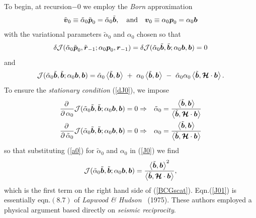 To begin, at recursion$-0$ we employ the {\em Born \/} approximation 
\begin{equation}
\tilde{\bmi  v}_{0}\equiv \tilde{\alpha}_{0}\tilde{\bmi  p}_{0}= 
\tilde{\alpha}_{0}\tilde{\bmi  b},
\quad \mbox{and} \quad
{\bmi  v}_{0}\equiv {\alpha}_{0}{\bmi  p}_{0}= {\alpha}_{0}{\bmi  b}
\end{equation}
with the variational parameters $\tilde{\alpha}_{0}$ and ${\alpha}_{0}$ 
chosen so that 
\begin{equation} \label{dJ0}
 \delta{\cal J}({\tilde{\alpha}}_{0}{\tilde{\bmi  p}}_{0},{\tilde{\bmi  
r}}_{-1};
{\alpha}_{0}{{\bmi  p}}_{0},{{\bmi  r}}_{-1})=\delta{\cal 
J}({\tilde{\alpha}}_{0}{\tilde{\bmi  b}},{\tilde{\bmi  b}};
{\alpha}_{0}{{\bmi  b}},{{\bmi  b}})=0
\end{equation}
and
\begin{equation} \label{J0}
{\cal 
J}({\tilde{\alpha}}_{0}{\tilde{\bmi  b}},{\tilde{\bmi  b}};
{\alpha}_0{{\bmi  b}},{{\bmi  
b}})=\tilde{\alpha}_{0}\left\langle\tilde{\bmi  
b},{\bmi  b}\right\rangle
\ +\  {\alpha}_{0} \left\langle\tilde{\bmi  b},{\bmi  b}\right\rangle
\ - \ \tilde{\alpha}_{0} {\alpha}_{0} \left\langle\tilde{\bmi  b},{\CB H} 
\cdot
{\bmi  b}\right\rangle.
\end{equation} 
To ensure the {\em stationary condition\/} (\ref{dJ0}), we impose
\begin{eqnarray} \label{a0}
{\frac{ \partial   \,}{ \partial   \,{ \alpha 
}_{0}}}{\cal 
J}({\tilde{\alpha}}_{0}{\tilde{\bmi  b}},{\tilde{\bmi  b}};
{\alpha}_0{{\bmi  b}},{{\bmi  b}})=0 &  
\Rightarrow  & {\tilde{ \alpha 
}}_{0}={\frac{\left\langle{\tilde{\bmi  b},{\bmi  
b}}\right\rangle}{\left\langle{\tilde{\bmi  b},{\CB H}
\cdot   {\bmi  b}}\right\rangle}}\nonumber\\
{\frac{ \partial   \,}{ \partial   \,\tilde{ \alpha 
}_{0}}}{\cal 
J}({\tilde{\alpha}}_{0}{\tilde{\bmi  b}},{\tilde{\bmi  b}};
{\alpha}_0{{\bmi  b}},{{\bmi  b}})=0 &  
\Rightarrow   & {{ \alpha 
}}_{0}={\frac{\left\langle{\tilde{\bmi  b},{\bmi  
b}}\right\rangle}{\left\langle{\tilde{\bmi  b},{\CB H}
\cdot   {\bmi  b}}\right\rangle}}
\end{eqnarray} 
so that substituting (\ref{a0}) for ${\tilde{\alpha}}_{0}$ and 
${\alpha}_{0}$
in (\ref{J0}) we find
\begin{equation} \label{J01}
{\cal 
J}({\tilde{\alpha}}_{0}{\tilde{\bmi  b}},{\tilde{\bmi  b}};
{\alpha}_0{{\bmi  b}},{{\bmi  b}})={\frac{\left\langle{\tilde{\bmi  
b},{\bmi  
b}}\right\rangle^2}{\left\langle{\tilde{\bmi  b},{\CB H}
\cdot   {\bmi  b}}\right\rangle}},
\end{equation} 
which is the first term on the right hand side of (\ref{BCGscat}). 
Eqn.(\ref{J01}) is essentially eqn.$(8.7)$ of {\em Lapwood \& Hudson\/} 
~(1975). 
These authors employed a physical argument based directly on {\em seismic 
reciprocity}.

